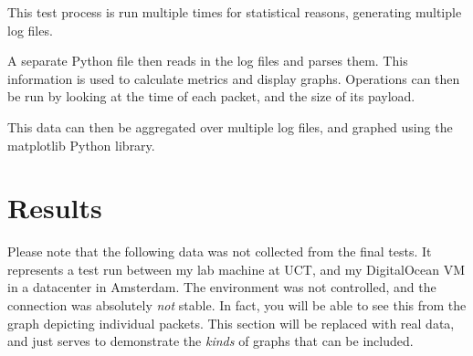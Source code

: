 \documentclass{sig-alternate-05-2015}
\begin{document}
This test process is run multiple times for statistical reasons, generating multiple log files.

A separate Python file then reads in the log files and parses them. This information is used to calculate metrics and display graphs.
Operations can then be run by looking at the time of each packet, and the size of its payload. 

This data can then be aggregated over multiple log files, and graphed using the matplotlib Python library.

\section{Results}
Please note that the following data was not collected from the final tests. It represents a test run between my lab machine at UCT, and my DigitalOcean VM in a datacenter in Amsterdam. The environment was not controlled, and the connection was absolutely \textit{not} stable. In fact, you will be able to see this from the graph depicting individual packets. This section will be replaced with real data, and just serves to demonstrate the \textit{kinds} of graphs that can be included. 
\end{document}
